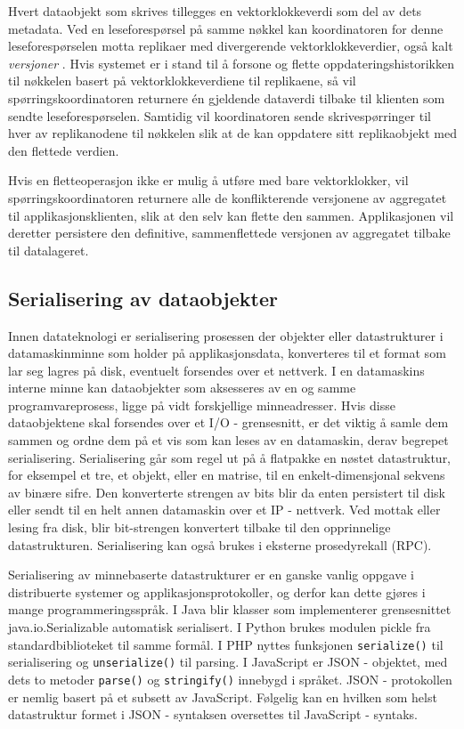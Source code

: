Hvert dataobjekt som skrives tillegges en vektorklokkeverdi som del av dets metadata. Ved en leseforespørsel på samme nøkkel kan koordinatoren for denne leseforespørselen motta replikaer med divergerende vektorklokkeverdier, også kalt \emph{versjoner} \citep{kreps2009}. Hvis systemet er i stand til å forsone og flette oppdateringshistorikken til nøkkelen basert på vektorklokkeverdiene til replikaene, så vil spørringskoordinatoren returnere én gjeldende dataverdi tilbake til klienten som sendte leseforespørselen. Samtidig vil koordinatoren sende skrivespørringer til hver av replikanodene til nøkkelen slik at de kan oppdatere sitt replikaobjekt med den flettede verdien.

Hvis en fletteoperasjon ikke er mulig å utføre med bare vektorklokker, vil spørrings\-koordinatoren returnere alle de konflikterende versjonene av aggregatet til applikasjonsklienten, slik at den selv kan flette den sammen. Applikasjonen vil deretter persistere den definitive, sammenflettede versjonen av aggregatet tilbake til datalageret.

\subsection{Serialisering av dataobjekter}
Innen datateknologi er serialisering prosessen der objekter eller datastrukturer i datamaskinminne som holder på applikasjonsdata, konverteres til et format som lar seg lagres på disk, eventuelt forsendes over et nettverk. I en datamaskins interne minne kan dataobjekter som aksesseres av en og samme programvareprosess, ligge på vidt forskjellige minneadresser. Hvis disse dataobjektene skal forsendes over et I/O - grensesnitt, er det viktig å samle dem sammen og ordne dem på et vis som kan leses av en datamaskin, derav begrepet serialisering. Serialisering går som regel ut på å flatpakke en nøstet datastruktur, for eksempel et tre, et objekt, eller en matrise, til en enkelt-dimensjonal sekvens av binære sifre. Den konverterte strengen av bits blir da enten persistert til disk eller sendt til en helt annen datamaskin over et IP - nettverk. Ved mottak eller lesing fra disk, blir bit-strengen konvertert tilbake til den opprinnelige datastrukturen. Serialisering kan også brukes i eksterne prosedyrekall (RPC).

Serialisering av minnebaserte datastrukturer er en ganske vanlig oppgave i distribuerte systemer og applikasjonsprotokoller, og derfor kan dette gjøres i mange programmeringsspråk. I Java blir klasser som implementerer grensesnittet java.io.Serializable automatisk serialisert. I Python brukes modulen pickle fra standardbiblioteket til samme formål. I PHP nyttes funksjonen \texttt{serialize()} til serialisering og \texttt{unserialize()} til parsing. I JavaScript er JSON - objektet, med dets to metoder \texttt{parse()} og \texttt{stringify()} innebygd i språket. JSON - protokollen er nemlig basert på et subsett av JavaScript. Følgelig kan en hvilken som helst datastruktur formet i JSON - syntaksen oversettes til JavaScript - syntaks.


